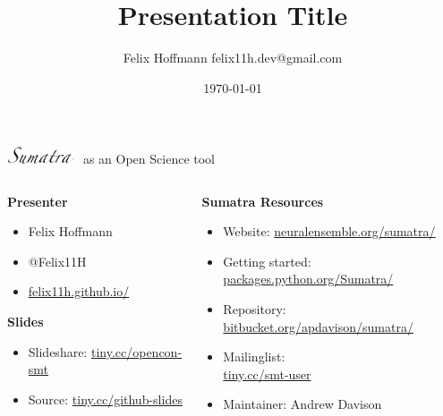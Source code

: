\documentclass[xcolor=svgnames,11pt]{beamer}
\title {Presentation Title}
\author[Felix Hoffmann]{%
  Felix Hoffmann \vspace{0.25cm} \newline %
  \small felix11h.dev@gmail.com %
}
\institute[]{}
\date{\today}
\begin{document}



\begin{frame}
  \begin{center} 
    \Large \includegraphics[width=2.0cm]{sumatra_logo_up.png} \textcolor{white}{-}as an
    Open Science tool
  \end{center}
  \vspace{0.35cm}

  \begin{columns}[t]
    \begin{column}{0.4\textwidth}        
      \textbf{Presenter}
      \normalsize
      \vspace{0.18cm}
      \begin{itemize}[leftmargin=0.6cm]
      \item[] Felix Hoffmann
      \item[] @Felix11H
      \item[] \href{http://felix11h.github.io/}{felix11h.github.io/}
      \end{itemize}

      \vspace{0.38cm}
      \textbf{Slides}
      \normalsize
      \vspace{0.18cm}
      \begin{itemize}[leftmargin=0.6cm]
      \item[] Slideshare: \href{http://tiny.cc/opencon-smt}{tiny.cc/opencon-smt}
      \item[] Source: \href{http://tiny.cc/github-slides}{tiny.cc/github-slides}
      \end{itemize}


    \end{column}
    \begin{column}{0.64\textwidth}
      \textbf{Sumatra Resources}
      \vspace{0.28cm}
      \normalsize 
      \begin{itemize}[leftmargin=0.6cm]
      \item[] Website:
        \href{http://neuralensemble.org/sumatra/}{neuralensemble.org/sumatra/}\\
      \item[]Getting started: \href{http://packages.python.org/Sumatra/}{packages.python.org/Sumatra/}\\
      \item[]Repository:
        \href{http://bitbucket.org/apdavison/sumatra/}{bitbucket.org/apdavison/sumatra/}
      \item[] Mailinglist: \\\href{http://tiny.cc/smt-user}{tiny.cc/smt-user}
      \item[] Maintainer: Andrew Davison 



\end{itemize}
\end{column}
\end{columns}
\end{frame}
\end{document}
